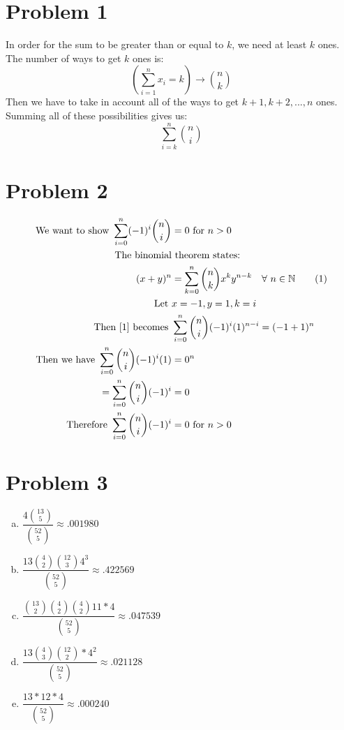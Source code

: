 \documentclass{article}
\begin{document}
\begin{flushleft}
\section*{Problem 1}
In order for the sum to be greater than or equal to $k$, we need at least $k$ ones. The number of ways to get $k$ ones is:
\[\left(\sum \limits_{i=1}^{n}x_i=k\right) \to {n \choose k}
\]
Then we have to take in account all of the ways to get $k+1,k+2,...,n$ ones.\\
Summing all of these possibilities gives us:
\[\sum \limits_{i=k}^{n}{n \choose i}
\]
\section*{Problem 2}
\begin{align*}
\text{We want to show } \sum \limits_{i=0}^{n}(-1)^i{n \choose i}&=0 \text{ for } n>0 \\
\text{The binomial}& \text{ theorem states:}\\
(x+y)^n&=\sum \limits_{k=0}^{n}{n \choose k}x^k y^{n-k} \quad \forall \ n\in \mathbb{N}  \label{1}\tag{1}\\
\text{Let }& x=-1, y=1, k=i\\
\text{Then } \eqref{1} \text{ becomes }& \sum \limits_{i=0}^{n}{n \choose i}(-1)^i(1)^{n-i}=(-1+1)^n\\
\text{Then we have } \sum \limits_{i=0}^{n}{n \choose i}(-1)^i(1)&=0^n\\
=\sum \limits_{i=0}^{n}{n \choose i}(-1)^i&=0\\
\text{Therefore }
\sum \limits_{i=0}^{n}{n \choose i}(-1)^{i}&=0 \text{ for } n>0
\end{align*}
\pagebreak
\section*{Problem 3}
\begin{enumerate}[(a)]
\item $\dfrac{4{13\choose 5}}{{52\choose 5}} \approx .001980$ \\
\item $\dfrac{13{4\choose 2}{12 \choose 3}4^3}{{52\choose 5}} \approx .422569$\\
\item $\dfrac{{13 \choose 2}{4\choose 2}{4\choose 2}11*4}{{52\choose 5}}\approx .047539$\\
\item $\dfrac{13{4\choose 3}{12 \choose 2}*4^2}{{52\choose 5}}\approx .021128$\\
\item $\dfrac{13*12*4}{{52\choose 5}}\approx .000240$
\end{enumerate}
\pagebreak

\end{flushleft}
\end{document}
